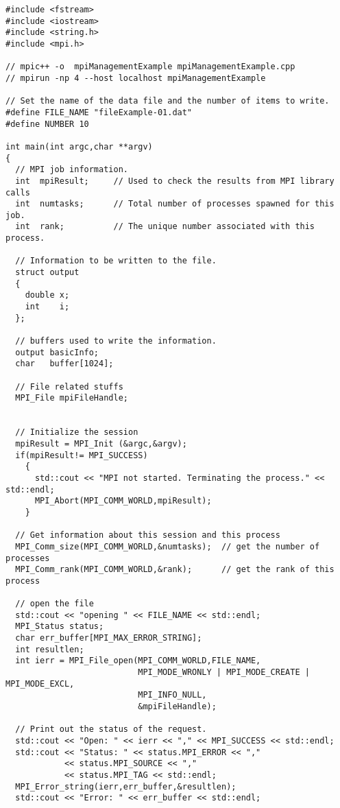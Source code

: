 \begin{lstlisting}[caption={Example of writing information to a file.},
                   basicstyle=\scriptsize,
                   label=listing:writeFile]
#include <fstream>
#include <iostream>
#include <string.h>
#include <mpi.h>

// mpic++ -o  mpiManagementExample mpiManagementExample.cpp 
// mpirun -np 4 --host localhost mpiManagementExample

// Set the name of the data file and the number of items to write.
#define FILE_NAME "fileExample-01.dat"
#define NUMBER 10

int main(int argc,char **argv)
{
  // MPI job information.
  int  mpiResult;     // Used to check the results from MPI library calls
  int  numtasks;      // Total number of processes spawned for this job.
  int  rank;          // The unique number associated with this process.

  // Information to be written to the file.
  struct output 
  {
    double x;
    int    i;
  };

  // buffers used to write the information.
  output basicInfo;
  char   buffer[1024];

  // File related stuffs
  MPI_File mpiFileHandle;


  // Initialize the session
  mpiResult = MPI_Init (&argc,&argv);
  if(mpiResult!= MPI_SUCCESS)
    {
      std::cout << "MPI not started. Terminating the process." << std::endl;
      MPI_Abort(MPI_COMM_WORLD,mpiResult);
    }

  // Get information about this session and this process 
  MPI_Comm_size(MPI_COMM_WORLD,&numtasks);  // get the number of processes
  MPI_Comm_rank(MPI_COMM_WORLD,&rank);      // get the rank of this process

  // open the file
  std::cout << "opening " << FILE_NAME << std::endl;
  MPI_Status status;
  char err_buffer[MPI_MAX_ERROR_STRING];
  int resultlen;
  int ierr = MPI_File_open(MPI_COMM_WORLD,FILE_NAME, 
                           MPI_MODE_WRONLY | MPI_MODE_CREATE | MPI_MODE_EXCL, 
                           MPI_INFO_NULL, 
                           &mpiFileHandle);

  // Print out the status of the request.
  std::cout << "Open: " << ierr << "," << MPI_SUCCESS << std::endl;
  std::cout << "Status: " << status.MPI_ERROR << "," 
            << status.MPI_SOURCE << "," 
            << status.MPI_TAG << std::endl;
  MPI_Error_string(ierr,err_buffer,&resultlen);
  std::cout << "Error: " << err_buffer << std::endl;



\end{lstlisting}
